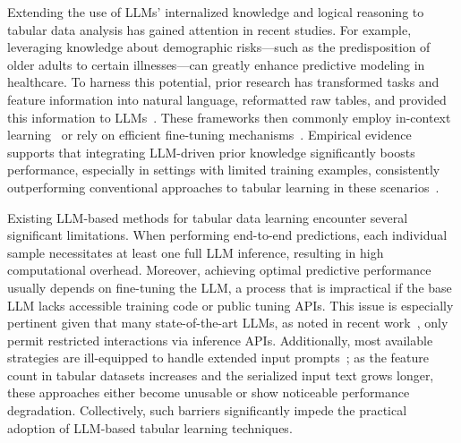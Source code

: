 Extending the use of LLMs’ internalized knowledge and logical reasoning to tabular data analysis has gained attention in recent studies. For example, leveraging knowledge about demographic risks—such as the predisposition of older adults to certain illnesses—can greatly enhance predictive modeling in healthcare. To harness this potential, prior research has transformed tasks and feature information into natural language, reformatted raw tables, and provided this information to LLMs~\cite{dinh2022lift,wang2023anypredict}. These frameworks then commonly employ in-context learning~\cite{nam2023semi} or rely on efficient fine-tuning mechanisms~\cite{dinh2022lift,hegselmann2023tabllm}. Empirical evidence supports that integrating LLM-driven prior knowledge significantly boosts performance, especially in settings with limited training examples, consistently outperforming conventional approaches to tabular learning in these scenarios~\cite{hegselmann2023tabllm}.

Existing LLM-based methods for tabular data learning encounter several significant limitations. When performing end-to-end predictions, each individual sample necessitates at least one full LLM inference, resulting in high computational overhead. Moreover, achieving optimal predictive performance usually depends on fine-tuning the LLM, a process that is impractical if the base LLM lacks accessible training code or public tuning APIs. This issue is especially pertinent given that many state-of-the-art LLMs, as noted in recent work~\cite{anil2023palm,openai2023gpt4}, only permit restricted interactions via inference APIs. Additionally, most available strategies are ill-equipped to handle extended input prompts~\cite{liu2023lost}; as the feature count in tabular datasets increases and the serialized input text grows longer, these approaches either become unusable or show noticeable performance degradation. Collectively, such barriers significantly impede the practical adoption of LLM-based tabular learning techniques.


